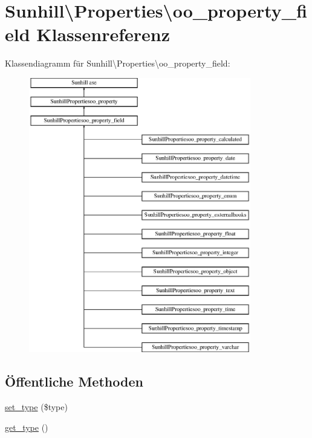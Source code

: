 \hypertarget{classSunhill_1_1Properties_1_1oo__property__field}{}\section{Sunhill\textbackslash{}Properties\textbackslash{}oo\+\_\+property\+\_\+field Klassenreferenz}
\label{classSunhill_1_1Properties_1_1oo__property__field}
Klassendiagramm für Sunhill\textbackslash{}Properties\textbackslash{}oo\+\_\+property\+\_\+field\+:\begin{figure}[H]
\begin{center}
\leavevmode
\includegraphics[height=12.000000cm]{da/da9/classSunhill_1_1Properties_1_1oo__property__field}
\end{center}
\end{figure}
\subsection*{Öffentliche Methoden}
\begin{DoxyCompactItemize}
\item 
\hyperlink{classSunhill_1_1Properties_1_1oo__property__field_a971b0d4b4cb715100500e950bf69e0ed}{set\+\_\+type} (\$type)
\item 
\hyperlink{classSunhill_1_1Properties_1_1oo__property__field_a5db135bad0a79d82f65d09816a0882f1}{get\+\_\+type} ()
\end{DoxyCompactItemize}
